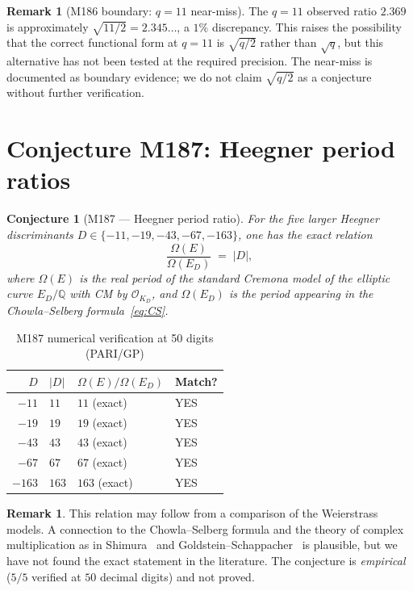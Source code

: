 \documentclass[12pt]{amsart}
\newtheorem{conjecture}[theorem]{Conjecture}
\theoremstyle{definition}
\newtheorem{remark}[theorem]{Remark}
\newcommand{\Q}{\mathbb{Q}}
\newcommand{\OK}{\mathcal{O}_K}
\newcommand{\Omega}{\varOmega}
\begin{document}
\begin{remark}[M186 boundary: $q=11$ near-miss]
  \label{rem:M186-q11}
  The $q=11$ observed ratio $2.369$ is approximately $\sqrt{11/2} = 2.345\ldots$,
  a $1\%$ discrepancy.
  This raises the possibility that the correct functional form at $q = 11$ is
  $\sqrt{q/2}$ rather than $\sqrt{q}$, but this alternative has not been tested
  at the required precision.
  The near-miss is documented as boundary evidence; we do not claim
  $\sqrt{q/2}$ as a conjecture without further verification.
\end{remark}

\section{Conjecture M187: Heegner period ratios}
\label{sec:M187}

\begin{conjecture}[M187 --- Heegner period ratio]
  \label{conj:M187}
  For the five larger Heegner discriminants
  $D \in \{-11, -19, -43, -67, -163\}$, one has the exact relation
  \[
    \frac{\Omega(E)}{\Omega(E_D)} \;=\; |D|,
  \]
  where $\Omega(E)$ is the real period of the standard Cremona model of
  the elliptic curve $E_D / \Q$ with CM by $\OK_D$, and $\Omega(E_D)$ is
  the period appearing in the Chowla--Selberg formula~\eqref{eq:CS}.
\end{conjecture}

\begin{table}[h]
  \caption{M187 numerical verification at 50 digits (PARI/GP)}
  \label{tab:M187}
  \renewcommand{\arraystretch}{1.25}
  \begin{tabular}{rlll}
    \toprule
    $D$ & $|D|$ & $\Omega(E)/\Omega(E_D)$ & Match? \\
    \midrule
    $-11$  & $11$  & $11$ (exact) & YES \\
    $-19$  & $19$  & $19$ (exact) & YES \\
    $-43$  & $43$  & $43$ (exact) & YES \\
    $-67$  & $67$  & $67$ (exact) & YES \\
    $-163$ & $163$ & $163$ (exact) & YES \\
    \bottomrule
  \end{tabular}
\end{table}

\begin{remark}
  This relation may follow from a comparison of the Weierstrass models.
  A connection to the Chowla--Selberg formula and the theory of complex
  multiplication as in Shimura~\cite{CITE-NEEDED-Shimura1971} and
  Goldstein--Schappacher~\cite{GoldsteinSchappacher1981} is plausible,
  but we have not found the exact statement in the literature.
  The conjecture is \emph{empirical} ($5/5$ verified at $50$ decimal digits)
  and not proved.
\end{remark}
\end{document}
